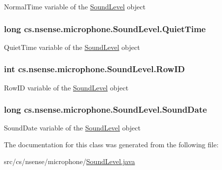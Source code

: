 Normal\-Time variable of the \hyperlink{classcs_1_1nsense_1_1microphone_1_1_sound_level}{Sound\-Level} object \hypertarget{classcs_1_1nsense_1_1microphone_1_1_sound_level_ad5aac89ed2f8c6fb1a77e644def35d1b}{
\subsubsection[{Quiet\-Time}]{\setlength{\rightskip}{0pt plus 5cm}long cs.\-nsense.\-microphone.\-Sound\-Level.\-Quiet\-Time}}\label{classcs_1_1nsense_1_1microphone_1_1_sound_level_ad5aac89ed2f8c6fb1a77e644def35d1b}
Quiet\-Time variable of the \hyperlink{classcs_1_1nsense_1_1microphone_1_1_sound_level}{Sound\-Level} object \hypertarget{classcs_1_1nsense_1_1microphone_1_1_sound_level_a9a4f8eba4ecb027fc5cd9b0cd23cc0cf}{
\subsubsection[{Row\-I\-D}]{\setlength{\rightskip}{0pt plus 5cm}int cs.\-nsense.\-microphone.\-Sound\-Level.\-Row\-I\-D}}\label{classcs_1_1nsense_1_1microphone_1_1_sound_level_a9a4f8eba4ecb027fc5cd9b0cd23cc0cf}
Row\-I\-D variable of the \hyperlink{classcs_1_1nsense_1_1microphone_1_1_sound_level}{Sound\-Level} object \hypertarget{classcs_1_1nsense_1_1microphone_1_1_sound_level_aa2a844bae130868044f94495c82b8290}{
\subsubsection[{Sound\-Date}]{\setlength{\rightskip}{0pt plus 5cm}long cs.\-nsense.\-microphone.\-Sound\-Level.\-Sound\-Date}}\label{classcs_1_1nsense_1_1microphone_1_1_sound_level_aa2a844bae130868044f94495c82b8290}
Sound\-Date variable of the \hyperlink{classcs_1_1nsense_1_1microphone_1_1_sound_level}{Sound\-Level} object 

The documentation for this class was generated from the following file\-:\begin{DoxyCompactItemize}
\item 
src/cs/nsense/microphone/\hyperlink{_sound_level_8java}{Sound\-Level.\-java}\end{DoxyCompactItemize}
